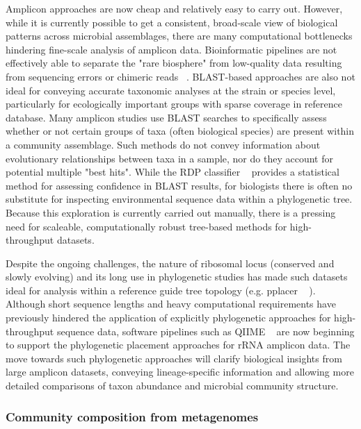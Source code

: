 \documentclass[10pt]{article}
\begin{document}
Amplicon approaches are now cheap and relatively easy to carry out. 
However, while it is currently possible to get a consistent, broad-scale view of biological patterns across microbial assemblages, there are many computational bottlenecks hindering fine-scale analysis of amplicon data. 
Bioinformatic pipelines are not effectively able to separate the "rare biosphere" from low-quality data resulting from sequencing errors or chimeric reads ~\cite{Bik2012}. 
BLAST-based approaches are also not ideal for conveying accurate taxonomic analyses at the strain or species level, particularly for ecologically important groups with sparse coverage in reference database. 
Many amplicon studies use BLAST searches to specifically assess whether or not certain groups of taxa (often biological species) are present within a community assemblage. 
Such methods do not convey information about evolutionary relationships between taxa in a sample, nor do they account for potential multiple "best hits". 
While the RDP classifier ~\cite{Wang2007} provides a statistical method for assessing confidence in BLAST results, for biologists there is often no substitute for inspecting environmental sequence data within a phylogenetic tree.
Because this exploration is currently carried out manually, there is a pressing need for scaleable, computationally robust tree-based methods for high-throughput datasets.

Despite the ongoing challenges, the nature of ribosomal locus (conserved and slowly evolving) and its long use in phylogenetic studies has made such datasets ideal for analysis within a reference guide tree topology  (e.g. pplacer ~\cite{Matsen2010} ). 
Although short sequence lengths and heavy computational requirements have previously hindered the application of explicitly phylogenetic approaches for high-throughput sequence data, software pipelines such as QIIME ~\cite{Caporaso2010} are now beginning to support the phylogenetic placement approaches for rRNA amplicon data.  
The move towards such phylogenetic approaches will clarify biological insights from large amplicon datasets, conveying lineage-specific information and allowing more detailed comparisons of taxon abundance and microbial community structure.
      
\subsubsection*{Community composition from metagenomes}
\end{document}
